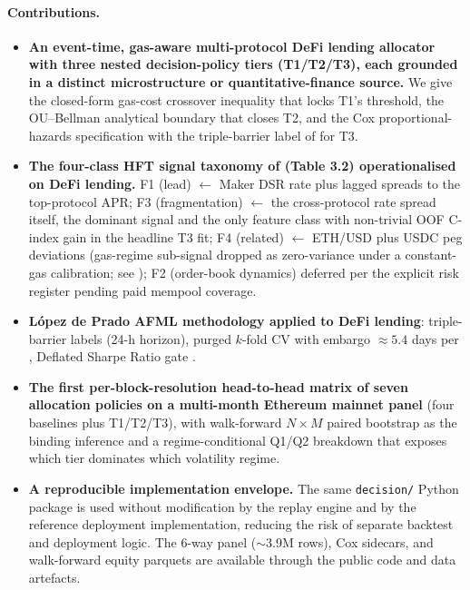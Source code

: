 \paragraph{Contributions.}
\begin{itemize}
  \item \textbf{An event-time, gas-aware multi-protocol DeFi
    lending allocator with three nested decision-policy tiers
    (T1/T2/T3), each grounded in a distinct microstructure or
    quantitative-finance source.}  We give the closed-form gas-cost
    crossover inequality that locks T1's threshold, the
    OU--Bellman analytical boundary that closes T2, and the Cox
    proportional-hazards specification with the triple-barrier
    label of \cite{lopezdeprado2018} for T3.

  \item \textbf{The four-class HFT signal taxonomy of
    \cite{mackenzie2021} (Table 3.2) operationalised on DeFi
    lending.}  F1 (lead) $\leftarrow$ Maker DSR rate plus lagged
    spreads to the top-protocol APR; F3 (fragmentation)
    $\leftarrow$ the cross-protocol rate spread itself, the
    dominant signal and the only feature class with non-trivial
    OOF C-index gain in the headline T3 fit; F4 (related)
    $\leftarrow$ ETH/USD plus USDC peg deviations
    (gas-regime sub-signal dropped as zero-variance under a
    constant-gas calibration; see );
    F2 (order-book dynamics) deferred per the explicit risk
    register pending paid mempool coverage.

  \item \textbf{L\'opez de Prado AFML methodology applied to DeFi
    lending}: triple-barrier labels (24-h horizon), purged $k$-fold
    CV with embargo $\approx 5.4$ days per
    \cite[Ch.\,7]{lopezdeprado2018},
    Deflated Sharpe Ratio gate
    \cite[Ch.\,14.7.3]{lopezdeprado2018}.

  \item \textbf{The first per-block-resolution head-to-head matrix
    of seven allocation policies on a multi-month Ethereum mainnet
    panel} (four baselines plus T1/T2/T3), with walk-forward
    $N \!\times\! M$ paired bootstrap as the binding inference and
    a regime-conditional Q1/Q2 breakdown that exposes which tier
    dominates which volatility regime.

  \item \textbf{A reproducible implementation envelope.}  The same
    \texttt{decision/} Python package is used without modification
    by the replay engine and by the reference deployment
    implementation, reducing the risk of separate backtest and
    deployment logic.  The 6-way panel ($\sim$3.9M rows), Cox
    sidecars, and walk-forward equity parquets are available through
    the public code and data artefacts.
\end{itemize}

